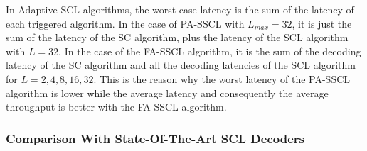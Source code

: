 In Adaptive SCL algorithms, the worst case latency is the sum of the latency of
each triggered algorithm. In the case of PA-SSCL with $L_{max}=32$, it is just
the sum of the latency of the SC algorithm, plus the latency of the SCL
algorithm with $L=32$. In the case of the FA-SSCL algorithm, it is the sum of
the decoding latency of the SC algorithm and all the decoding latencies of the
SCL algorithm for $L={2,4,8,16,32}$. This is the reason why the worst latency of
the PA-SSCL algorithm is lower while the average latency and consequently the
average throughput is better with the FA-SSCL algorithm.

\subsubsection{Comparison With State-Of-The-Art SCL Decoders}


